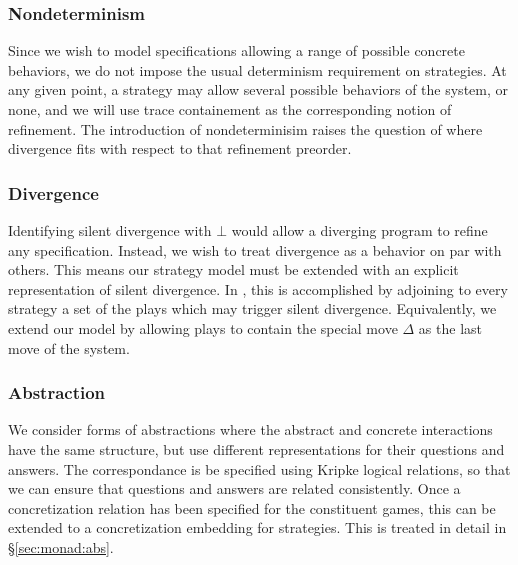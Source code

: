 \documentclass[acmsmall,timestamp,review,anonymous]{acmart}
\begin{document}

\subsubsection{Nondeterminism} %

Since we wish to model specifications
allowing a range of possible concrete behaviors,
we do not impose
the usual determinism requirement on strategies.
At any given point,
a strategy may allow several possible behaviors
of the system, or none,
and we will use trace containement as
the corresponding notion of refinement.
The introduction of nondeterminisim raises the question of
where divergence fits with respect to that refinement preorder.


\subsubsection{Divergence} %

Identifying silent divergence with $\bot$
would allow a diverging program to refine any specification.
Instead,
we wish to treat divergence as a behavior on par with others.
This means our strategy model must be extended
with an explicit representation of silent divergence.
In \cite{gsnondet},
this is accomplished by adjoining to every strategy
a set of the plays which may trigger silent divergence.
Equivalently,
we extend our model by allowing plays to contain
the special move $\Delta$ as the last move of the system.



\subsubsection{Abstraction} %

We consider forms of abstractions where
the abstract and concrete interactions have the same structure,
but use different representations for their questions and answers.
The correspondance is be specified
using Kripke logical relations,
so that we can ensure that questions and answers are related consistently.
Once a concretization relation has been specified
for the constituent games,
this can be extended to a concretization embedding for strategies.
This is treated in detail in \S\ref{sec:monad:abs}.
\end{document}
